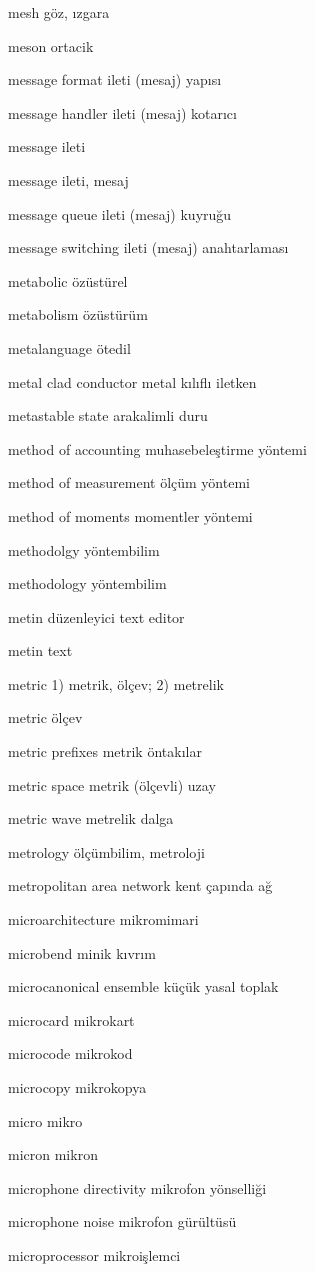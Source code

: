 \documentclass[12pt,fleqn]{article}\usepackage{../../common}
\begin{document}
mesh göz, ızgara

meson ortacik

message format ileti (mesaj) yapısı

message handler ileti (mesaj) kotarıcı

message ileti

message ileti, mesaj

message queue ileti (mesaj) kuyruğu

message switching ileti (mesaj) anahtarlaması

metabolic özüstürel

metabolism özüstürüm

metalanguage ötedil

metal clad conductor metal kılıflı iletken

metastable state arakalimli duru

method of accounting muhasebeleştirme yöntemi

method of measurement ölçüm yöntemi

method of moments momentler yöntemi

methodolgy yöntembilim

methodology yöntembilim

metin düzenleyici text editor

metin text

metric 1) metrik, ölçev; 2) metrelik

metric ölçev

metric prefixes metrik öntakılar

metric space metrik (ölçevli) uzay

metric wave metrelik dalga

metrology ölçümbilim, metroloji

metropolitan area network kent çapında ağ

microarchitecture mikromimari

microbend minik kıvrım

microcanonical ensemble küçük yasal toplak

microcard mikrokart

microcode mikrokod

microcopy mikrokopya

micro mikro

micron mikron

microphone directivity mikrofon yönselliği

microphone noise mikrofon gürültüsü

microprocessor mikroişlemci
\end{document}
